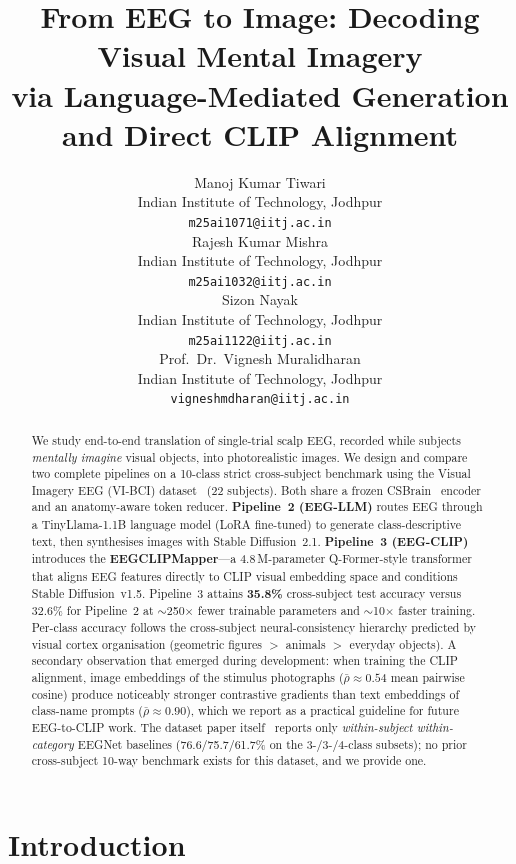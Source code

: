\documentclass{article}
\title{From EEG to Image: Decoding Visual Mental Imagery\\
via Language-Mediated Generation and Direct CLIP Alignment}
\author{%
  Manoj Kumar Tiwari \\
  Indian Institute of Technology, Jodhpur \\
  \texttt{m25ai1071@iitj.ac.in} \\
  \And
  Rajesh Kumar Mishra \\
  Indian Institute of Technology, Jodhpur \\
  \texttt{m25ai1032@iitj.ac.in} \\
  \And
  Sizon Nayak \\
  Indian Institute of Technology, Jodhpur \\
  \texttt{m25ai1122@iitj.ac.in} \\
  \And
  Prof.\ Dr.\ Vignesh Muralidharan \\
  Indian Institute of Technology, Jodhpur \\
  \texttt{vigneshmdharan@iitj.ac.in} \\
}
\begin{document}
\maketitle

\begin{abstract}
We study end-to-end translation of single-trial scalp EEG, recorded while subjects \emph{mentally imagine} visual objects, into photorealistic images. We design and compare two complete pipelines on a 10-class strict cross-subject benchmark using the Visual Imagery EEG (VI-BCI) dataset~\citep{figshare_eeg,figshare_paper} (22 subjects). Both share a frozen CSBrain~\citep{zhu2024csbrain} encoder and an anatomy-aware token reducer. \textbf{Pipeline~2 (EEG-LLM)} routes EEG through a TinyLlama-1.1B language model (LoRA fine-tuned) to generate class-descriptive text, then synthesises images with Stable Diffusion~2.1. \textbf{Pipeline~3 (EEG-CLIP)} introduces the \textbf{EEGCLIPMapper}---a 4.8\,M-parameter Q-Former-style transformer that aligns EEG features directly to CLIP visual embedding space and conditions Stable Diffusion~v1.5. Pipeline~3 attains \textbf{35.8\%} cross-subject test accuracy versus 32.6\% for Pipeline~2 at $\sim$250$\times$ fewer trainable parameters and $\sim$10$\times$ faster training. Per-class accuracy follows the cross-subject neural-consistency hierarchy predicted by visual cortex organisation (geometric figures $>$ animals $>$ everyday objects). A secondary observation that emerged during development: when training the CLIP alignment, image embeddings of the stimulus photographs ($\bar{\rho}\!\approx\!0.54$ mean pairwise cosine) produce noticeably stronger contrastive gradients than text embeddings of class-name prompts ($\bar{\rho}\!\approx\!0.90$), which we report as a practical guideline for future EEG-to-CLIP work. The dataset paper itself~\citep{figshare_paper} reports only \emph{within-subject within-category} EEGNet baselines (76.6/75.7/61.7\% on the 3-/3-/4-class subsets); no prior cross-subject 10-way benchmark exists for this dataset, and we provide one.
\end{abstract}

\section{Introduction}
\end{document}
